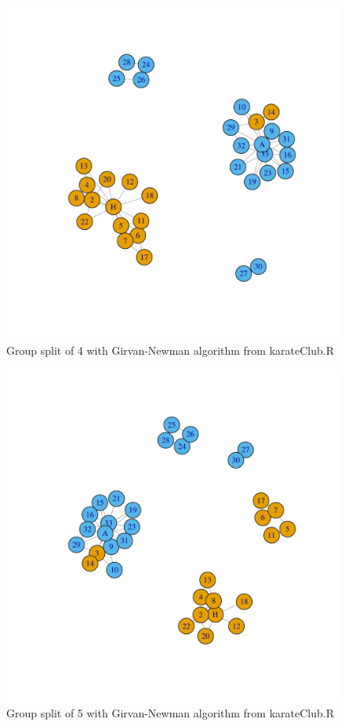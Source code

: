 \documentclass[letterpaper,11pt]{article}
\begin{document}
\begin{figure}[h]
\centering
\includegraphics[scale=0.6]{FourGroupFinalBarchart.pdf}
\caption{Group split of 4 with Girvan-Newman algorithm from karateClub.R}
\label{fig:split4}
\end{figure}

\begin{figure}[h]
\centering
\includegraphics[scale=0.6]{FiveGroupFinalBarchart.pdf}
\caption{Group split of 5 with Girvan-Newman algorithm from karateClub.R}
\label{fig:split5}
\end{figure}
\end{document}
